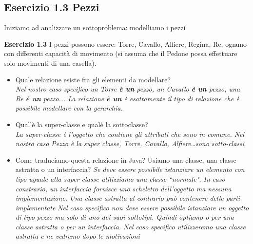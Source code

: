\documentclass{article}
\begin{document}
\subsection{Esercizio 1.3 Pezzi}
Iniziamo ad analizzare un sottoproblema: modelliamo i pezzi
\begin{framed}
\textbf{Esercizio 1.3} I pezzi possono essere: Torre, Cavallo, Alfiere, Regina, Re, ognuno con differenti capacit\`a di movimento (si assuma che il Pedone possa effettuare solo movimenti di una casella).
\end{framed}
\begin{itemize}
\item Quale relazione esiste fra gli elementi da modellare?\\
\textit{Nel nostro caso specifico un Torre \textbf{\`e un} pezzo, un Cavallo \textbf{\`e un} pezzo,  una Re  \textbf{\`e un} pezzo\ldots. La relazione \textbf{\`e un} \`e esattamente il tipo di relazione che \`e possibile modellare con la gerarchia.}
\item Qual'\`e la super-classe e qual\`e la sottoclasse?\\
\textit{La super-classe \`e l'oggetto che contiene gli attributi che sono in comune. Nel nostro caso Pezzo \`e la super classe, Torre, Cavallo, Alfiere\ldots sono sotto-classi}
\item Come traduciamo questa relazione in Java? Usiamo una classe, una classe astratta o un interfaccia?
\textit{Se deve essere possibile istanziare un elemento con tipo uguale alla super-classe utilizziamo una classe ``normale". In caso constrario, un interfaccia fornisce uno scheletro dell'oggetto ma nessuna implementazione. Una classe astratta al contrario pu\`o contenere delle parti implementate}
\textit{Nel caso specifico non deve essere possibile istanziare un oggetto di tipo pezzo ma solo di uno dei suoi sottotipi. Quindi optiamo o per una classe astratta o per un interfaccia. Nel caso specifico utilizzeremo una classe astratta e ne vedremo dopo le motivazioni}
\end{itemize}
\end{document}
